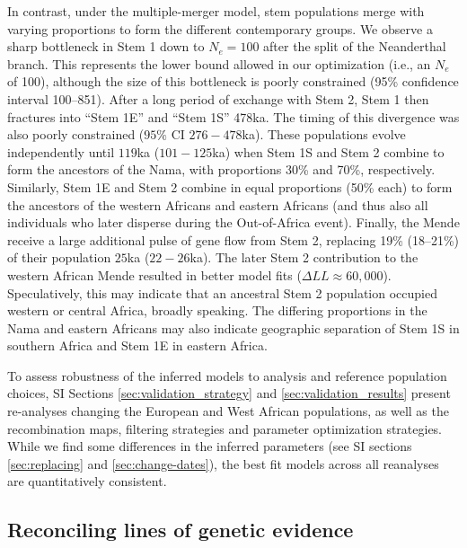 \documentclass[]{article}
\begin{document}
In contrast, under the multiple-merger model, stem populations merge with
varying proportions to form the different contemporary groups.  We observe a
sharp bottleneck in Stem 1 down to $N_e=100$ after the split of the Neanderthal
branch. This represents the lower bound allowed in our optimization (i.e., an
$N_e$ of 100), although the size of this bottleneck is poorly constrained (95\%
confidence interval 100--851). After a long period of exchange with Stem 2,
Stem 1 then fractures into ``Stem 1E'' and ``Stem 1S'' 478ka. The timing of
this divergence was also poorly constrained ($95\%$ CI $276-478$ka).  These
populations evolve independently until $119$ka ($101-125$ka) when Stem 1S and
Stem 2 combine to form the ancestors of the Nama, with proportions 30\% and
70\%, respectively. Similarly, Stem 1E and Stem 2 combine in equal proportions
(50\% each) to form the ancestors of the western Africans and eastern Africans
(and thus also all individuals who later disperse during the Out-of-Africa
event).  Finally, the Mende receive a large additional pulse of gene flow from
Stem 2, replacing 19\% (18--21\%) of their population $25$ka ($22-26$ka). The
later Stem 2 contribution to the western African Mende resulted in better model
fits ($\Delta LL \approx 60,000$). Speculatively, this may indicate that an
ancestral Stem 2 population occupied western or central Africa, broadly
speaking. The differing proportions in the Nama and eastern Africans may also
indicate geographic separation of Stem 1S in southern Africa and Stem 1E in
eastern Africa. 

To assess robustness of the inferred models to analysis and reference
population choices, SI Sections \ref{sec:validation_strategy} and
\ref{sec:validation_results} present re-analyses changing the European and West
African populations, as well as the recombination maps, filtering strategies
and parameter optimization strategies. While we find some differences in the
inferred parameters (see SI sections \ref{sec:replacing} and
\ref{sec:change-dates}), the best fit models across all reanalyses are
quantitatively consistent. 

\subsection*{Reconciling lines of genetic evidence}
\end{document}

